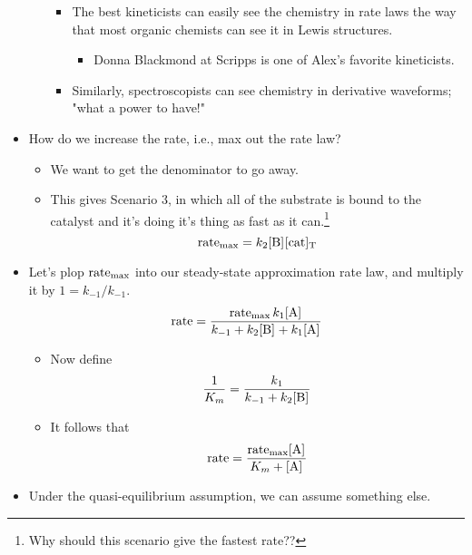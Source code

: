 \documentclass[../notes.tex]{subfiles}
\begin{document}
\begin{itemize}
\begin{itemize}
\begin{itemize}
            \item The best kineticists can easily see the chemistry in rate laws the way that most organic chemists can see it in Lewis structures.
            \begin{itemize}
                \item Donna Blackmond at Scripps is one of Alex's favorite kineticists.
            \end{itemize}
            \item Similarly, spectroscopists can see chemistry in derivative waveforms; "what a power to have!"
        \end{itemize}
    \end{itemize}
    \item How do we increase the rate, i.e., max out the rate law?
    \begin{itemize}
        \item We want to get the denominator to go away.
        \item This gives Scenario 3, in which all of the substrate is bound to the catalyst and it's doing it's thing as fast as it can.\footnote{Why should this scenario give the fastest rate??}
        \begin{equation*}
            \rate_\text{max} = k_2\cnc{B}\cnc[T]{cat}
        \end{equation*}
    \end{itemize}
    \item Let's plop $\operatorname{rate}_\text{max}$ into our steady-state approximation rate law, and multiply it by $1=k_{-1}/k_{-1}$.
    \begin{equation*}
        \rate = \frac{\rate_\text{max}k_1\cnc{A}}{k_{-1}+k_2\cnc{B}+k_1\cnc{A}}
    \end{equation*}
    \begin{itemize}
        \item Now define
        \begin{equation*}
            \frac{1}{K_m} = \frac{k_1}{k_{-1}+k_2\cnc{B}}
        \end{equation*}
        \item It follows that
        \begin{equation*}
            \rate = \frac{\rate_\text{max}\cnc{A}}{K_m+\cnc{A}}
        \end{equation*}
    \end{itemize}
    \item Under the quasi-equilibrium assumption, we can assume something else.
    \begin{equation*}

\end{equation*}
\end{itemize}
\end{document}
